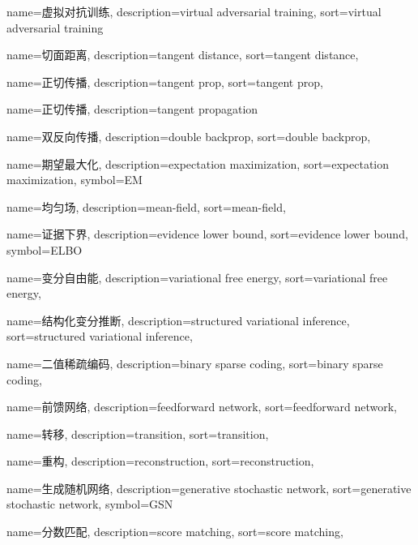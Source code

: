 {
  name=虚拟对抗训练,
  description={virtual adversarial training},
  sort={virtual adversarial training}
}

{
  name=切面距离,
  description={tangent distance},
  sort={tangent distance},
}

{
  name=正切传播,
  description={tangent prop},
  sort={tangent prop},
}

{
  name=正切传播,
  description={tangent propagation}
}

{
  name=双反向传播,
  description={double backprop},
  sort={double backprop},
}

{
  name=期望最大化,
  description={expectation maximization},
  sort={expectation maximization},
  symbol={EM}
}

{
  name=均匀场,
  description={mean-field},
  sort={mean-field},
}

{
  name=证据下界,
  description={evidence lower bound},
  sort={evidence lower bound},
  symbol={ELBO}
}

{
  name=变分自由能,
  description={variational free energy},
  sort={variational free energy},
}

{
  name=结构化变分推断,
  description={structured variational inference},
  sort={structured variational inference},
}

{
  name=二值稀疏编码,
  description={binary sparse coding},
  sort={binary sparse coding},
}

{
  name=前馈网络,
  description={feedforward network},
  sort={feedforward network},
}

{
  name=转移,
  description={transition},
  sort={transition},
}

{
  name=重构,
  description={reconstruction},
  sort={reconstruction},
}

{
  name=生成随机网络,
  description={generative stochastic network},
  sort={generative stochastic network},
  symbol={GSN}
}

{
  name=分数匹配,
  description={score matching},
  sort={score matching},
}

